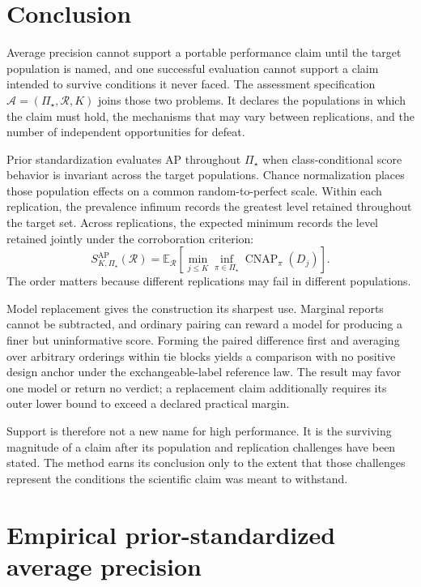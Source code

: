 \documentclass[11pt]{article}
\newcommand{\CNAP}{\operatorname{CNAP}}
\newcommand{\Regime}{\mathcal{R}}
\newcommand{\Assess}{\mathcal{A}}
\newcommand{\PSet}{\Pi_\star}
\newcommand{\E}{\mathbb{E}}
\newcommand{\SRob}{S_{K,\PSet}^{\mathrm{AP}}(\Regime)}
\theoremstyle{remark}
\begin{document}
\section{Conclusion}

Average precision cannot support a portable performance claim until the target population is named, and one successful evaluation cannot support a claim intended to survive conditions it never faced. The assessment specification $\Assess=(\PSet,\Regime,K)$ joins those two problems. It declares the populations in which the claim must hold, the mechanisms that may vary between replications, and the number of independent opportunities for defeat.

Prior standardization evaluates AP throughout $\PSet$ when class-conditional score behavior is invariant across the target populations. Chance normalization places those population effects on a common random-to-perfect scale. Within each replication, the prevalence infimum records the greatest level retained throughout the target set. Across replications, the expected minimum records the level retained jointly under the corroboration criterion:
\[
\SRob
=
\E_{\Regime}
\left[
\min_{j\leq K}
\inf_{\pi\in\PSet}\CNAP_\pi(D_j)
\right].
\]
The order matters because different replications may fail in different populations.

Model replacement gives the construction its sharpest use. Marginal reports cannot be subtracted, and ordinary pairing can reward a model for producing a finer but uninformative score. Forming the paired difference first and averaging over arbitrary orderings within tie blocks yields a comparison with no positive design anchor under the exchangeable-label reference law. The result may favor one model or return no verdict; a replacement claim additionally requires its outer lower bound to exceed a declared practical margin.

Support is therefore not a new name for high performance. It is the surviving magnitude of a claim after its population and replication challenges have been stated. The method earns its conclusion only to the extent that those challenges represent the conditions the scientific claim was meant to withstand.

\appendix

\section{Empirical prior-standardized average precision}
\label{app:ap}
\end{document}
